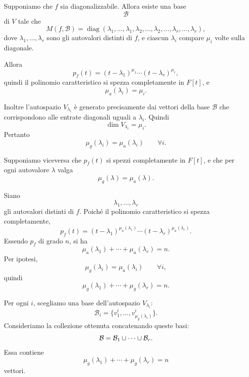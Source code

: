 \documentclass[a4paper]{article}
\begin{document}
\begin{snippetproof}{}
    \begin{iffproof}
    \item Supponiamo che \(f\) sia diagonalizzabile. Allora esiste una base
        \[
            \mathcal{B}
        \]
        di \(V\) tale che
        \[
            M(f,\mathcal{B})
            =
            \operatorname{diag}(
                \lambda_1,\ldots,\lambda_1,
                \lambda_2,\ldots,\lambda_2,
                \ldots,
                \lambda_r,\ldots,\lambda_r
            ),
        \]
        dove \(\lambda_1,\ldots,\lambda_r\) sono gli autovalori distinti di \(f\), e ciascun \(\lambda_i\) compare \(\mu_i\) volte sulla diagonale.

        Allora
        \[
            p_f(t)
            =
            (t-\lambda_1)^{\mu_1}
            \cdots
            (t-\lambda_r)^{\mu_r},
        \]
        quindi il polinomio caratteristico si spezza completamente in \(F[t]\), e
        \[
            \mu_a(\lambda_i)=\mu_i.
        \]

        Inoltre l'autospazio \(V_{\lambda_i}\) è generato precisamente dai vettori della base \(\mathcal{B}\) che corrispondono alle entrate diagonali uguali a \(\lambda_i\). Quindi
        \[
            \dim V_{\lambda_i}=\mu_i.
        \]
        Pertanto
        \[
            \mu_g(\lambda_i)=\mu_a(\lambda_i)
            \qquad
            \forall i.
        \]

    \item Supponiamo viceversa che \(p_f(t)\) si spezzi completamente in \(F[t]\), e che per ogni autovalore \(\lambda\) valga
        \[
            \mu_g(\lambda)=\mu_a(\lambda).
        \]

        Siano
        \[
            \lambda_1,\ldots,\lambda_r
        \]
        gli autovalori distinti di \(f\). Poiché il polinomio caratteristico si spezza completamente,
        \[
            p_f(t)
            =
            (t-\lambda_1)^{\mu_a(\lambda_1)}
            \cdots
            (t-\lambda_r)^{\mu_a(\lambda_r)}.
        \]
        Essendo \(p_f\) di grado \(n\), si ha
        \[
            \mu_a(\lambda_1)+\cdots+\mu_a(\lambda_r)=n.
        \]
        Per ipotesi,
        \[
            \mu_g(\lambda_i)=\mu_a(\lambda_i)
            \qquad
            \forall i,
        \]
        quindi
        \[
            \mu_g(\lambda_1)+\cdots+\mu_g(\lambda_r)=n.
        \]

        Per ogni \(i\), scegliamo una base dell'autospazio \(V_{\lambda_i}\):
        \[
            \mathcal{B}_i
            =
            \{v_1^i,\ldots,v_{\mu_g(\lambda_i)}^i\}.
        \]
        Consideriamo la collezione ottenuta concatenando queste basi:
        \[
            \mathcal{B}
            =
            \mathcal{B}_1\cup\cdots\cup\mathcal{B}_r.
        \]
        Essa contiene
        \[
            \mu_g(\lambda_1)+\cdots+\mu_g(\lambda_r)=n
        \]
        vettori.


\end{iffproof}
\end{snippetproof}
\end{document}
